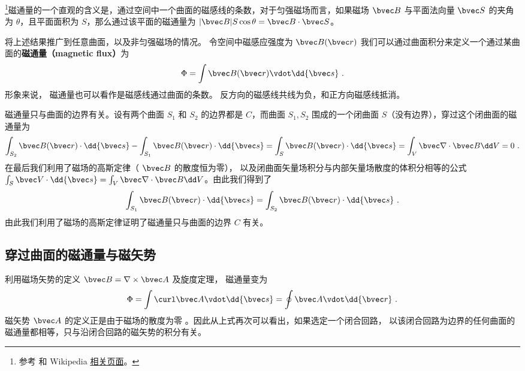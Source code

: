 
\begin{issues}
\issueDraft
{}
\end{issues}


\footnote{参考 \cite{GriffE} 和 Wikipedia \href{https://en.wikipedia.org/wiki/Magnetic_flux}{相关页面}。}磁通量的一个直观的含义是，通过空间中一个曲面的磁感线的条数，对于匀强磁场而言，如果磁场 $\bvec B$ 与平面法向量 $\bvec S$ 的夹角为 $\theta$，且平面面积为 $S$，那么通过该平面的磁通量为 $|\bvec B|S \cos\theta = \bvec B\cdot \bvec S$。

将上述结果推广到任意曲面，以及非匀强磁场的情况。
令空间中磁感应强度为 $\bvec B(\bvec r)$ 我们可以通过曲面积分来定义一个通过某曲面的\textbf{磁通量（magnetic flux）}为
\begin{equation}
\Phi  = \int \bvec B(\bvec r) \vdot \dd{\bvec s}~.
\end{equation}
形象来说， 磁通量也可以看作是磁感线通过曲面的条数。 反方向的磁感线共线为负，和正方向磁感线抵消。

磁通量只与曲面的边界有关。设有两个曲面 $S_1$ 和 $S_2$ 的边界都是 $C$，而曲面 $S_1,S_2$ 围成的一个闭曲面 $S$（没有边界），穿过这个闭曲面的磁通量为
\begin{equation}
\int_{S_2} \bvec B(\bvec r)\cdot \dd {\bvec s }- \int_{S_1} \bvec B(\bvec r)\cdot \dd {\bvec s} = \int_{S} \bvec B(\bvec r)\cdot \dd {\bvec s}=\int_V \bvec \nabla \cdot \bvec B \dd V=0~.
\end{equation}
在最后我们利用了磁场的高斯定律（ $\bvec B$ 的散度恒为零）， 以及闭曲面矢量场积分与内部矢量场散度的体积分相等的公式 $\int_S \bvec V\cdot \dd{\bvec s}=\int_V \bvec \nabla\cdot \bvec B \dd V$。由此我们得到了
\begin{equation}
\int_{S_1} \bvec B(\bvec r)\cdot \dd {\bvec s}
=
\int_{S_2} \bvec B(\bvec r)\cdot \dd {\bvec s }~.
\end{equation}
由此我们利用了磁场的高斯定律证明了磁通量只与曲面的边界 $C$ 有关。
\subsection{穿过曲面的磁通量与磁矢势}
利用磁场矢势的定义 $\bvec B=\nabla\times \bvec A$ %
及旋度定理， %
磁通量变为
\begin{equation} \label{eq_BFlux_2}
\Phi  = \int \curl \bvec A \vdot \dd{\bvec s}  = \oint \bvec A \vdot \dd{\bvec r}~.
\end{equation}
磁矢势 $\bvec A$ 的定义正是由于磁场的散度为零%
。因此从上式再次可以看出，如果选定一个闭合回路， 以该闭合回路为边界的任何曲面的磁通量都相等，只与沿闭合回路的磁矢势的积分有关。

